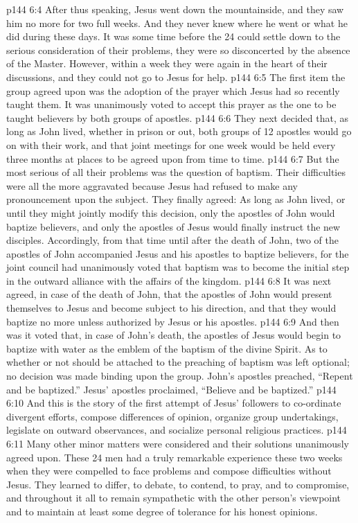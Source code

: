\vs p144 6:4 After thus speaking, Jesus went down the mountainside, and they saw him no more for two full weeks. And they never knew where he went or what he did during these days. It was some time before the 24 could settle down to the serious consideration of their problems, they were so disconcerted by the absence of the Master. However, within a week they were again in the heart of their discussions, and they could not go to Jesus for help.
\vs p144 6:5 \pc The first item the group agreed upon was the adoption of the prayer which Jesus had so recently taught them. It was unanimously voted to accept this prayer as the one to be taught believers by both groups of apostles.
\vs p144 6:6 They next decided that, as long as John lived, whether in prison or out, both groups of 12 apostles would go on with their work, and that joint meetings for one week would be held every three months at places to be agreed upon from time to time.
\vs p144 6:7 But the most serious of all their problems was the question of baptism. Their difficulties were all the more aggravated because Jesus had refused to make any pronouncement upon the subject. They finally agreed: As long as John lived, or until they might jointly modify this decision, only the apostles of John would baptize believers, and only the apostles of Jesus would finally instruct the new disciples. Accordingly, from that time until after the death of John, two of the apostles of John accompanied Jesus and his apostles to baptize believers, for the joint council had unanimously voted that baptism was to become the initial step in the outward alliance with the affairs of the kingdom.
\vs p144 6:8 It was next agreed, in case of the death of John, that the apostles of John would present themselves to Jesus and become subject to his direction, and that they would baptize no more unless authorized by Jesus or his apostles.
\vs p144 6:9 And then was it voted that, in case of John’s death, the apostles of Jesus would begin to baptize with water as the emblem of the baptism of the divine Spirit. As to whether or not  should be attached to the preaching of baptism was left optional; no decision was made binding upon the group. John’s apostles preached, “Repent and be baptized.” Jesus’ apostles proclaimed, “Believe and be baptized.”
\vs p144 6:10 \pc And this is the story of the first attempt of Jesus’ followers to co\hyp{}ordinate divergent efforts, compose differences of opinion, organize group undertakings, legislate on outward observances, and socialize personal religious practices.
\vs p144 6:11 Many other minor matters were considered and their solutions unanimously agreed upon. These 24 men had a truly remarkable experience these two weeks when they were compelled to face problems and compose difficulties without Jesus. They learned to differ, to debate, to contend, to pray, and to compromise, and throughout it all to remain sympathetic with the other person’s viewpoint and to maintain at least some degree of tolerance for his honest opinions.
